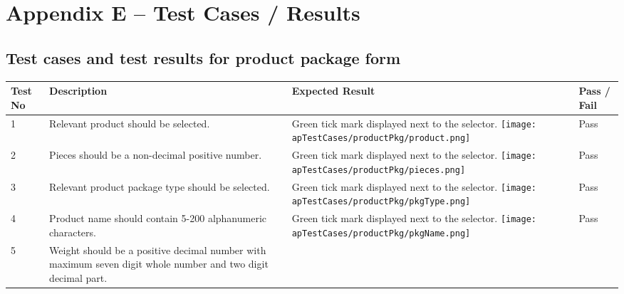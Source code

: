 \documentclass[12pt]{report}
\begin{document}
\setcounter{chapter}{5}
\setcounter{section}{0}
\setcounter{figure}{0}
\setcounter{table}{0}
\chapter*{\Huge Appendix E – Test Cases / Results}

\section{Test cases and test results for product package form}

\begin{longtable}{ | p{1cm} | p{5cm} | p{5cm} | p{2cm} | }
	\hline
	\bf{Test No} & \bf{Description} & \bf{Expected Result} & \bf{Pass / Fail} \\
	\hline
	1
	             &
	Relevant product should be selected.
	             &
	Green tick mark displayed next to the selector.\newline
	\texttt{[image: apTestCases/productPkg/product.png]}
	             &
	Pass                                                                      \\
	\hline
	2
	             &
	Pieces should be a non-decimal positive number.
	             &
	Green tick mark displayed next to the selector.\newline
	\texttt{[image: apTestCases/productPkg/pieces.png]}
	             &
	Pass                                                                      \\
	\hline
	3
	             &
	Relevant product package type should be selected.
	             &
	Green tick mark displayed next to the selector.\newline
	\texttt{[image: apTestCases/productPkg/pkgType.png]}
	             &
	Pass                                                                      \\
	\hline
	4
	             &
	Product name should contain 5-200 alphanumeric characters.
	             &
	Green tick mark displayed next to the selector.\newline
	\texttt{[image: apTestCases/productPkg/pkgName.png]}
	             &
	Pass                                                                      \\
	\hline
	5
	             &
	Weight should be a positive decimal number with maximum seven digit whole number and two digit decimal part.

\end{longtable}
\end{document}
